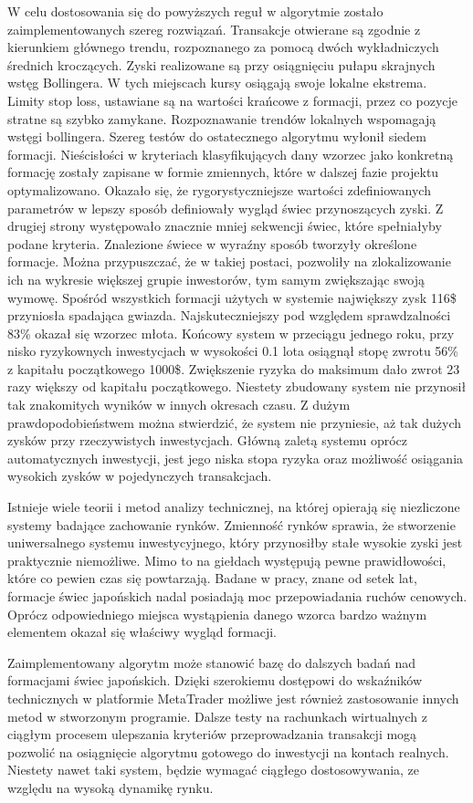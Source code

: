 \documentclass[pdflatex,11pt]{aghdpl}
\begin{document}
W celu dostosowania się do powyższych reguł w algorytmie zostało zaimplementowanych szereg rozwiązań. Transakcje otwierane są zgodnie z kierunkiem głównego trendu, rozpoznanego za pomocą dwóch wykładniczych średnich kroczących. Zyski realizowane są przy osiągnięciu pułapu skrajnych wstęg Bollingera. W tych miejscach kursy osiągają swoje lokalne ekstrema. Limity stop loss, ustawiane są na wartości krańcowe z formacji, przez co pozycje stratne są szybko zamykane. Rozpoznawanie trendów lokalnych wspomagają wstęgi bollingera. Szereg testów do ostatecznego algorytmu wyłonił siedem formacji. Nieścisłości w kryteriach klasyfikujących dany wzorzec jako konkretną formację zostały zapisane w formie zmiennych, które w dalszej fazie projektu optymalizowano. Okazało się, że rygorystyczniejsze wartości zdefiniowanych parametrów w lepszy sposób definiowały wygląd świec przynoszących zyski. Z drugiej strony występowało znacznie mniej sekwencji świec, które spełniałyby podane kryteria. Znalezione świece w wyraźny sposób tworzyły określone formacje. Można przypuszczać, że w takiej postaci, pozwoliły na zlokalizowanie ich na wykresie większej grupie inwestorów, tym samym zwiększając swoją wymowę. Spośród wszystkich formacji użytych w systemie największy zysk 116\$ przyniosła spadająca gwiazda. Najskuteczniejszy pod względem sprawdzalności 83\% okazał się wzorzec młota. Końcowy system w przeciągu jednego roku, przy nisko ryzykownych inwestycjach w wysokości 0.1 lota osiągnął stopę zwrotu 56\% z kapitału początkowego 1000\$. Zwiększenie ryzyka do maksimum dało zwrot 23 razy większy od kapitału początkowego. Niestety zbudowany system nie przynosił tak znakomitych wyników w innych okresach czasu. Z dużym prawdopodobieństwem można stwierdzić, że system nie przyniesie, aż tak dużych zysków przy rzeczywistych inwestycjach. Główną zaletą systemu oprócz automatycznych inwestycji, jest jego niska stopa ryzyka oraz możliwość osiągania wysokich zysków w pojedynczych transakcjach. 

Istnieje wiele teorii i metod analizy technicznej, na której opierają się niezliczone systemy badające zachowanie rynków. Zmienność rynków sprawia, że stworzenie uniwersalnego systemu inwestycyjnego, który przynosiłby stałe wysokie zyski jest praktycznie niemożliwe. Mimo to na giełdach występują pewne prawidłowości, które co pewien czas się powtarzają. Badane w pracy, znane od setek lat, formacje świec japońskich nadal posiadają moc przepowiadania ruchów cenowych. Oprócz odpowiedniego miejsca wystąpienia danego wzorca bardzo ważnym elementem okazał się właściwy wygląd formacji. 

Zaimplementowany algorytm może stanowić bazę do dalszych badań nad formacjami świec japońskich. Dzięki szerokiemu dostępowi do wskaźników technicznych w platformie MetaTrader możliwe jest również zastosowanie innych metod w stworzonym programie. Dalsze testy na rachunkach wirtualnych z ciągłym procesem ulepszania kryteriów przeprowadzania transakcji mogą pozwolić na osiągnięcie algorytmu gotowego do inwestycji na kontach realnych. Niestety nawet taki system, będzie wymagać ciągłego dostosowywania, ze względu na wysoką dynamikę rynku.
% 
% 



\end{document}
